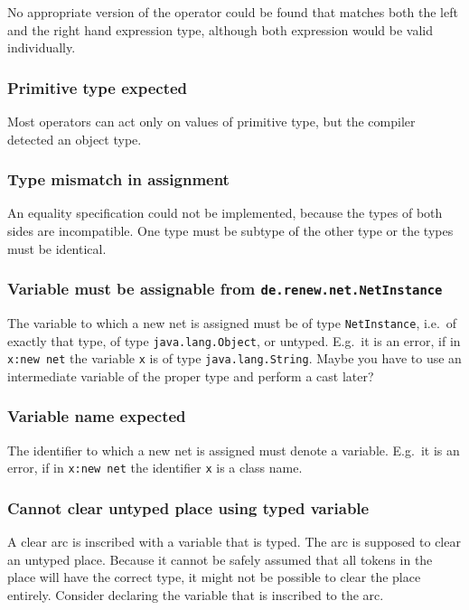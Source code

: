 No appropriate version of the operator could
be found that matches both the left and the right hand
expression type, although both expression would be valid
individually.

\subsubsection{Primitive type expected}

Most operators can act only on values of primitive type,
but the compiler detected an object type.

\subsubsection{Type mismatch in assignment}

An equality specification could not be implemented, because
the types of both sides are incompatible. One type must be
subtype of the other type or the types must be identical.

\subsubsection{Variable must be assignable from
\texttt{de.renew.net.NetInstance}}

The variable to which a new net is assigned must
be of type \texttt{NetInstance}, i.e.\ of
exactly that type, of type \texttt{java.lang.Object}, or untyped.
E.g.\ it is an error, if in \texttt{x:new net} the
variable \texttt{x} is of type \texttt{java.lang.String}.
Maybe you have to use an intermediate variable of the proper
type and perform a cast later?

\subsubsection{Variable name expected}

The identifier to which a new net is assigned must denote
a variable. E.g.\ it is an error, if in \texttt{x:new net} the
identifier \texttt{x} is a class name.

\subsubsection{Cannot clear untyped place using typed variable}

A clear arc is inscribed with a variable that is typed.
The arc is supposed to clear an untyped place. Because it
cannot be safely assumed that all tokens in the place will have
the correct type, it might not be possible to clear the
place entirely. Consider declaring the variable that
is inscribed to the arc.


